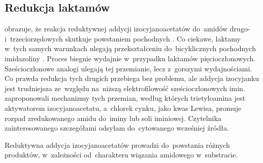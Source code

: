\subsection{Redukcja laktamów}\label{literature:schwartz:rings}
 obrazuje, że reakcja reduktywnej addycji izocyjanoacetatów
   do~amidów drugo-  i~trzeciorzędowych
   skutkuje powstaniem pochodnych 
  .
Co ciekawe,  laktamy  w~tych samych warunkach ulegają
  przekształceniu do~bicyklicznych pochodnych imidazoliny .
Proces biegnie wydajnie w~przypadku laktamów pięcioczłonowych.
Sześcioczłonowe analogi ulegają tej przemianie, lecz z~gorszymi wydajnościami.
Co prawda redukcja tych drugich przebiega bez problemu, ale addycja izocyjanku jest trudniejsza
  ze~względu na~niższą elektrofilowość sześcioczłonowych imin.
\citeauthor{zheng17} zaproponowali mechanizmy tych przemian, według których trietyloamina
  jest aktywatorem izocyjanoacetatu, a~chlorek cynku, jako kwas Lewisa, promuje rozpad
  zredukowanego amidu do~iminy lub soli iminiowej.
Czytelnika zainteresowanego szczegółami odsyłam do~cytowanego wcześniej źródła.
\begin{marginscheme}
  
  \caption{
    Reduktywna addycja izocyjanoacetatów prowadzi do~powstania różnych produktów,
      w~zależności od~charakteru wiązania amidowego w~substracie.
  }
  \label{sch:zr-ncac-add}
\end{marginscheme}

